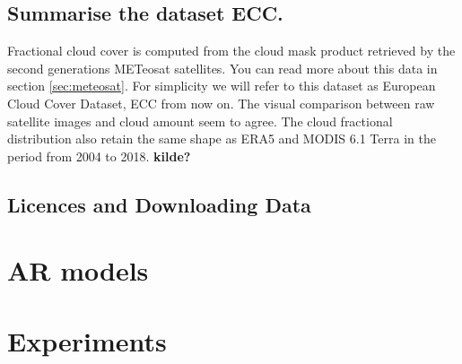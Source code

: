 \subsection{Summarise the dataset ECC.}
Fractional cloud cover is computed from the cloud mask product retrieved by the second generations METeosat satellites. You can read more about this data in section \ref{sec:meteosat}. For simplicity we will refer to this dataset as European Cloud Cover Dataset, ECC from now on. The visual comparison between raw satellite images and cloud amount seem to agree. The cloud fractional distribution also retain the same shape as ERA5 and MODIS 6.1 Terra in the period from 2004 to 2018. \textbf{kilde?}

\subsection{Licences and Downloading Data} \label{sec:downloading_data}

\section{AR models}

\section{Experiments}






